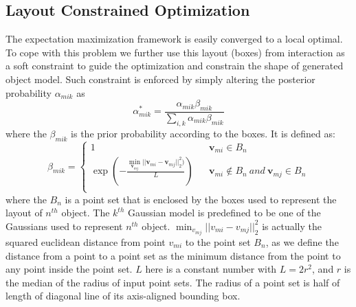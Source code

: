 \subsection{Layout Constrained Optimization}
The expectation maximization framework is easily converged to a local optimal. To cope with this problem we further use this layout (boxes) from interaction as a soft constraint to guide the optimization and constrain the shape of generated object model. Such constraint is enforced by simply altering the posterior probability $\alpha_{mik}$ as
\begin{equation}
	\label{equ:alteralpha}
	\alpha_{mik}^*=\frac{\alpha_{mik}\beta_{mik}}{\sum_{i,k}\alpha_{mik}\beta_{mik}}
\end{equation}
where the $\beta_{mik}$ is the prior probability according to the boxes. It is defined as:
\begin{equation}
	\beta_{mik}=\left\{
	\begin{array}{rcl}
		1& &\mathbf v_{mi} \in B_n\\
		\exp(-\frac{\min_{\mathbf v_{mj}}|| \mathbf v_{mi} - \mathbf v_{mj} ||_2^2  )}{L})& &\mathbf v_{mi} \notin B_n~and~\mathbf v_{mj} \in B_n\\
	\end{array} \right.
\end{equation}
where the $B_n$ is a point set that is enclosed by the boxes used to represent the layout of $n^{th}$ object. The $k^{th}$ Gaussian model is predefined to be one of the Gaussians used to represent $n^{th}$ object. $\min_{v_{mj}}|| v_{mi} - v_{mj} ||_2^2$ is actually the squared euclidean distance from point $v_{mi}$ to the point set $B_n$, as we define the distance from a point to a point set as the minimum distance from the point to any point inside the point set. $L$ here is a constant number with $L=2r^2$, and $r$ is the median of the radius of input point sets. The radius of a point set is half of length of diagonal line of its axis-aligned bounding box.   

